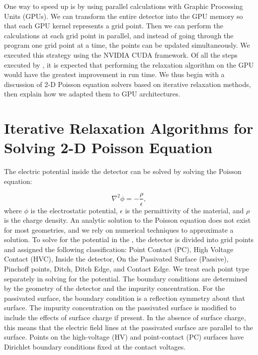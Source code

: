 One way to speed up {\ehd} is by using parallel calculations with Graphic Processing Units (GPUs). We can transform the entire detector into the GPU memory so that each GPU kernel represents a grid point. Then we can perform the calculations at each grid point in parallel, and instead of going through the program one grid point at a time, the points can be updated simultaneously. We executed this strategy using the NVIDIA CUDA {\cpp} framework. Of all the steps executed by {\ehd}, it is expected that performing the relaxation algorithm on the GPU would have the greatest improvement in run time. We thus begin with a discussion of 2-D Poisson equation solvers based on iterative relaxation methods, then explain how we adapted them to GPU architectures.

\section{Iterative Relaxation Algorithms for Solving 2-D Poisson Equation}
\label{ch4_sec_relax_algo}
The electric potential inside the detector can be solved by solving the Poisson equation:

\begin{equation}
    \nabla^2 \phi= -\frac{\rho}{\epsilon},
\end{equation}
\noindent
where $\phi$ is the electrostatic potential, $\epsilon$ is the permittivity of the material, and $\rho$ is the charge density. An analytic solution to the Poisson equation does not exist for most geometries, and we rely on numerical techniques to approximate a solution. To solve for the potential in the {\ehd}, the detector is divided into grid points and assigned the following classification: Point Contact (PC), High Voltage Contact (HVC), Inside the detector, On the Passivated Surface (Passive), Pinchoff points, Ditch, Ditch Edge, and Contact Edge. We treat each point type separately in solving for the potential. The boundary conditions are determined by the geometry of the detector and the impurity concentration. For the passivated surface, the boundary condition is a reflection symmetry about that surface. The impurity concentration on the passivated surface is modified to include the effects of surface charge if present. In the absence of surface charge, this means that the electric field lines at the passivated surface are parallel to the surface. Points on the high-voltage (HV) and point-contact (PC) surfaces have Dirichlet boundary conditions fixed at the contact voltages.

